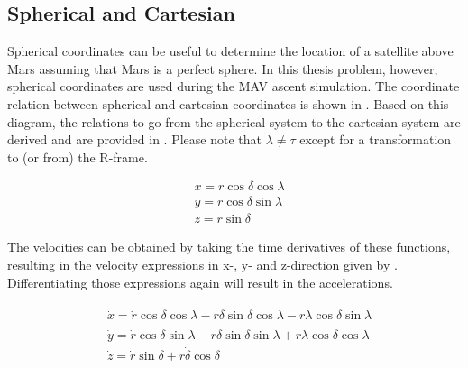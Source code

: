 
\subsection{Spherical and Cartesian}
\label{subsec:sphercart}
Spherical coordinates can be useful to determine the location of a satellite above Mars assuming that Mars is a perfect sphere. In this thesis problem, however, spherical coordinates are used during the \ac{MAV} ascent simulation. The coordinate relation between spherical and cartesian coordinates is shown in . Based on this diagram, the relations to go from the spherical system to the cartesian system are derived and are provided in . Please note that $\lambda\neq\tau$ except for a transformation to (or from) the R-frame.



\begin{equation} \label{eq:sphertocartp}
\begin{split}
& x=r\cos\delta \cos\lambda \\
& y=r\cos\delta \sin\lambda \\
& z=r\sin\delta 
\end{split}
\end{equation}

\noindent
The velocities can be obtained by taking the time derivatives of these functions, resulting in the velocity expressions in x-, y- and z-direction given by . Differentiating those expressions again will result in the accelerations.

\begin{equation} \label{eq:sphertocartv}
\begin{split}
& \dot{x}=\dot{r}\cos\delta \cos\lambda -r\dot{\delta}\sin\delta \cos\lambda -r\dot{\lambda}\cos\delta \sin\lambda \\
& \dot{y}=\dot{r}\cos\delta \sin\lambda -r\dot{\delta}\sin\delta \sin\lambda +r\dot{\lambda}\cos\delta \cos\lambda \\
& \dot{z}=\dot{r}\sin\delta +r\dot{\delta}\cos\delta 
\end{split}
\end{equation}

